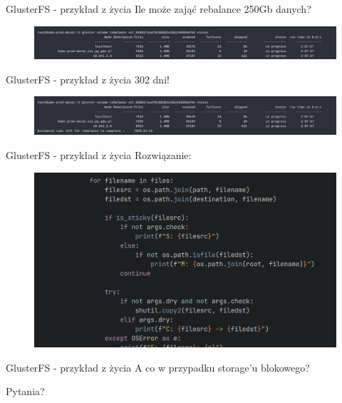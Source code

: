 \documentclass[polish,envcountsect,10pt]{beamer}
\begin{document}
\begin{frame}{GlusterFS - przykład z życia}
	Ile może zająć rebalance 250Gb danych?
	\begin{figure}[H]
    	\includegraphics[width=\linewidth]{images/noeta.png}
	\end{figure}
\end{frame}

\begin{frame}{GlusterFS - przykład z życia}
	302 dni!
	\begin{figure}[H]
    	\includegraphics[width=\linewidth]{images/eta.png}
	\end{figure}
\end{frame}

\begin{frame}{GlusterFS - przykład z życia}
	Rozwiązanie:
	\begin{figure}[H]
    	\includegraphics[width=\linewidth]{images/script.png}
	\end{figure}
\end{frame}

\begin{frame}{GlusterFS - przykład z życia}
	A co w przypadku storage'u blokowego?
\end{frame}

\begin{frame}{Pytania?}
\end{frame}
\end{document}
